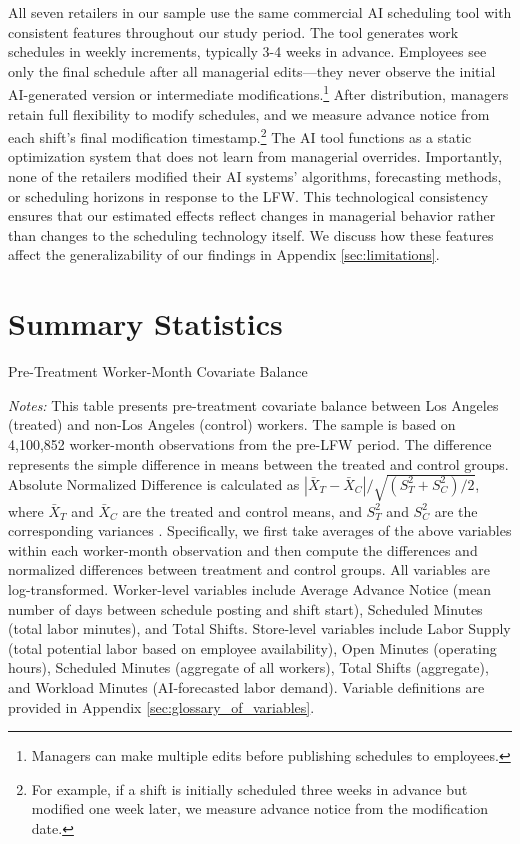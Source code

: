 \documentclass[letterpaper,11pt,leqno]{article}
\theoremstyle{paper}
\newcommand{\note}[2][]{\parbox{\textwidth}{\footnotesize\vspace*{10pt}\textit{#1}#2}}
\begin{document}
All seven retailers in our sample use the same commercial AI scheduling tool with consistent features throughout our study period. The tool generates work schedules in weekly increments, typically 3-4 weeks in advance. Employees see only the final schedule after all managerial edits—they never observe the initial AI-generated version or intermediate modifications.\footnote{Managers can make multiple edits before publishing schedules to employees.} After distribution, managers retain full flexibility to modify schedules, and we measure advance notice from each shift's final modification timestamp.\footnote{For example, if a shift is initially scheduled three weeks in advance but modified one week later, we measure advance notice from the modification date.} The AI tool functions as a static optimization system that does not learn from managerial overrides. Importantly, none of the retailers modified their AI systems' algorithms, forecasting methods, or scheduling horizons in response to the LFW. This technological consistency ensures that our estimated effects reflect changes in managerial behavior rather than changes to the scheduling technology itself. We discuss how these features affect the generalizability of our findings in Appendix \ref{sec:limitations}.


\section{Summary Statistics}

\begin{singlespace}
\begin{table}[H]
\caption{Pre-Treatment Worker-Month Covariate Balance}

\note{\scriptsize \textit{Notes: } This table presents pre-treatment covariate balance between Los Angeles (treated) and non-Los Angeles (control) workers. The sample is based on 4,100,852 worker-month observations from the pre-LFW period. The difference represents the simple difference in means between the treated and control groups. Absolute Normalized Difference is calculated as $|\bar{X}_T - \bar{X}_C|/\sqrt{(S^2_T + S^2_C)/2}$, where $\bar{X}_T$ and $\bar{X}_C$ are the treated and control means, and $S^2_T$ and $S^2_C$ are the corresponding variances \citep{imbens2015causal}. Specifically, we first take averages of the above variables within each worker-month observation and then compute the differences and normalized differences between treatment and control groups. All variables are log-transformed. Worker-level variables include Average Advance Notice (mean number of days between schedule posting and shift start), Scheduled Minutes (total labor minutes), and Total Shifts. Store-level variables include Labor Supply (total potential labor based on employee availability), Open Minutes (operating hours), Scheduled Minutes (aggregate of all workers), Total Shifts (aggregate), and Workload Minutes (AI-forecasted labor demand). Variable definitions are provided in Appendix \ref{sec:glossary_of_variables}.}
\label{table:worker_summary_wide}
\end{table}
\end{singlespace}
\end{document}
